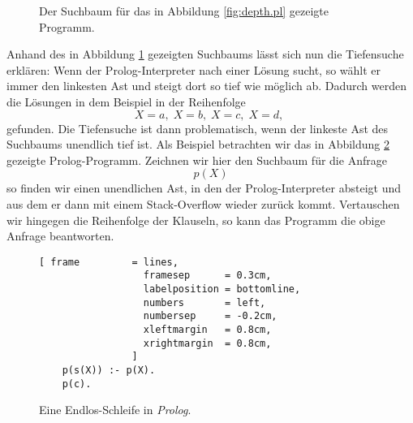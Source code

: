 \begin{figure}[!ht]
\centering
{}

\vspace*{-0.3cm}
\caption{Der Suchbaum f\"{u}r das in Abbildung \ref{fig:depth.pl} gezeigte Programm.}
\label{fig:depth-first.eps}
\end{figure}

Anhand des in Abbildung \ref{fig:depth-first.eps} gezeigten Suchbaums l\"{a}sst sich nun die Tiefensuche
erkl\"{a}ren:  Wenn der Prolog-Interpreter nach einer L\"{o}sung sucht, so w\"{a}hlt er immer den linkesten Ast
und steigt dort so tief wie m\"{o}glich ab.  Dadurch werden die L\"{o}sungen in dem Beispiel in der
Reihenfolge
\[ X = a,\; X = b,\; X = c,\; X = d,\; \]
gefunden.  Die Tiefensuche ist dann problematisch, wenn der linkeste Ast des Suchbaums unendlich
tief ist.  Als Beispiel betrachten wir das  in Abbildung \ref{fig:infinite.pl} gezeigte Prolog-Programm.
Zeichnen wir hier den Suchbaum f\"{u}r die Anfrage
\[ p(X) \]
 so finden wir einen unendlichen Ast, in den der Prolog-Interpreter
absteigt und aus dem er dann mit einem Stack-Overflow wieder zur\"{u}ck kommt.  Vertauschen wir hingegen
die Reihenfolge der Klauseln, so kann das Programm die obige Anfrage beantworten.

\begin{figure}[!ht]
\centering
\begin{Verbatim}[ frame         = lines, 
                  framesep      = 0.3cm, 
                  labelposition = bottomline,
                  numbers       = left,
                  numbersep     = -0.2cm,
                  xleftmargin   = 0.8cm,
                  xrightmargin  = 0.8cm,
                ]
    p(s(X)) :- p(X).
    p(c).
\end{Verbatim}
\vspace*{-0.3cm}
\caption{Eine Endlos-Schleife in \textsl{Prolog}.}
\label{fig:infinite.pl}
\end{figure}

